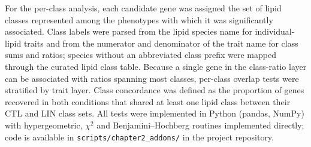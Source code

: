 For the per-class analysis, each candidate gene was assigned the set of lipid classes represented among the phenotypes with which it was significantly associated. Class labels were parsed from the lipid species name for individual-lipid traits and from the numerator and denominator of the trait name for class sums and ratios; species without an abbreviated class prefix were mapped through the curated lipid class table. Because a single gene in the class-ratio layer can be associated with ratios spanning most classes, per-class overlap tests were stratified by trait layer. Class concordance was defined as the proportion of genes recovered in both conditions that shared at least one lipid class between their CTL and LIN class sets. All tests were implemented in Python (pandas, NumPy) with hypergeometric, $\chi^2$ and Benjamini--Hochberg routines implemented directly; code is available in \texttt{scripts/chapter2\_addons/} in the project repository.
